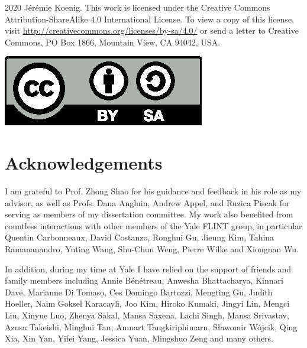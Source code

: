 \documentclass[11pt,oneside]{book}
\theoremstyle{definition}
\begin{document}
\setcounter{page}{2}

\vspace*{3in}
\thispagestyle{empty}%
\noindent
\begin{minipage}{.815\textwidth}
  \textcopyright{} 2020 J\'er\'emie Koenig.
  This work is licensed under
  the Creative Commons Attribution-ShareAlike 4.0 International License.
  To view a copy of this license,
  visit \url{http://creativecommons.org/licenses/by-sa/4.0/}
  or send a letter to
  Creative Commons, PO Box 1866, Mountain View, CA 94042, USA.
\end{minipage}
\hfill
  \includegraphics[width=.15\textwidth]{by-sa}

\doublespacing
\pagestyle{myheadings}

\cleardoublepage
{}
{}
\tableofcontents

\cleardoublepage
{}
{}
\listoffigures

\cleardoublepage
{}
{}
\listoftables

\chapter{Acknowledgements} %

I am grateful to Prof. Zhong Shao for his guidance and feedback
in his role as my advisor,
as well as Profs. Dana Angluin, Andrew Appel, and Ruzica Piscak
for serving as members of my dissertation committee.
My work also benefited from countless interactions
with other members of the Yale FLINT group,
in particular
Quentin Carbonneaux,
David Costanzo,
Ronghui Gu,
Jieung Kim,
Tahina Ramananandro,
Yuting Wang,
Shu-Chun Weng,
Pierre Wilke and
Xiongnan Wu.

In addition,
during my time at Yale
I have relied on the support of friends and family members
including
Annie B\'en\'etreau,
Anwesha Bhattacharya,
Kinnari Dave,
Marianne Di Tomaso,
Ces Domingo Bartozzi,
Mengting Gu,
Judith Hoeller,
Naim Goksel Karacayli,
Joo Kim,
Hiroko Kumaki,
Jingyi Lin,
Mengci Liu,
Xinyue Luo,
Zhenya Sakal,
Mansa Saxena,
Lachi Singh,
Mansa Srivastav,
Azusa Takeishi,
Minghui Tan,
Amnart Tangkiriphimarn,
S\l{}awomir W\'ojcik,
Qing Xia,
Xin Yan,
Yifei Yang,
Jessica Yuan,
Mingshuo Zeng
and many others.
\end{document}
